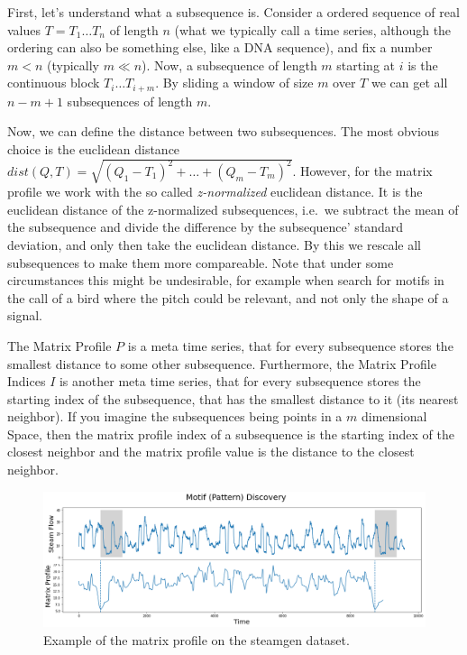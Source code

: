 \documentclass[12pt,a4paper]{article}
\begin{document}
First, let's understand what a subsequence is. Consider a ordered sequence of real values \(T=T_1 \dots T_n\) of length \(n\) (what we typically call a time series, although the ordering can also be something else, like a DNA sequence), and fix a number \(m < n\) (typically \(m \ll n\)). Now, a subsequence of length \(m\) starting at \(i\) is the continuous block \(T_i \dots T_{i+m}\). By sliding a window of size \(m\) over \(T\) we can get all \(n-m+1\) subsequences of length \(m\).

Now, we can define the distance between two subsequences. The most obvious choice is the euclidean distance
\(dist(Q, T) = \sqrt{\left(Q_1 - T_1\right)^2+\dots+\left(Q_m-T_m\right)^2}\). However, for the matrix profile we work with the so called
\emph{z-normalized} euclidean distance. It is the euclidean distance of the z-normalized subsequences, i.e.~we subtract the mean of the
subsequence and divide the difference by the subsequence' standard deviation, and only then take the euclidean distance. By this we rescale all subsequences to make them more compareable. Note that under some circumstances this might be undesirable, for example when search for motifs in the call of a bird where the pitch could be relevant, and not only the shape of a signal.

The Matrix Profile \(P\) is a meta time series, that for every subsequence stores the smallest distance to some other subsequence.
Furthermore, the Matrix Profile Indices \(I\) is another meta time series, that for every subsequence stores the starting index of the
subsequence, that has the smallest distance to it (its nearest neighbor). If you imagine the subsequences being points in a \(m\)
dimensional Space, then the matrix profile index of a subsequence is the starting index of the closest neighbor and the matrix profile value is the distance to the closest neighbor.

\begin{figure}
\centering
\includegraphics{images/MP_example.png}
\caption{Example of the matrix profile on the steamgen dataset.}
\end{figure}
\end{document}
